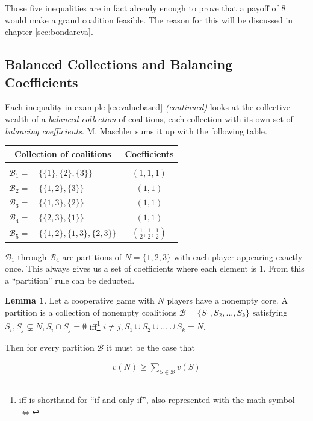 \documentclass[10pt,a4paper,titlepage]{article}
\theoremstyle{plain}
\theoremstyle{definition}
\newtheorem{lemma}[thm]{Lemma}
\begin{document}
Those five inequalities are in fact already enough to prove that a payoff of 8 would make a grand coalition feasible. The reason for this will be discussed in chapter \ref{sec:bondareva}.




\subsection{Balanced Collections and Balancing Coefficients}
Each inequality in example \ref{ex:valuebased} \textit{(continued)} looks at the collective wealth of a \textit{balanced collection} of coalitions, each collection with its own set of \textit{balancing coefficients}. M. Maschler\cite{maschler} sums it up with the following table.\vspace{8pt}

\begin{tabular}{ | r l | c | }
    \multicolumn{2}{c}{Collection of coalitions} & \multicolumn{1}{c}{Coefficients}\\[2pt]
    \hline & & \\[-8pt]
    $\mathcal{B}_1 =$ & $\{\{1\}, \{2\}, \{3\}\}$ & $(1, 1, 1)$\\[2pt]
    $\mathcal{B}_2 =$ & $\{\{1, 2\}, \{3\}\}$ & $(1, 1)$\\[2pt]
    $\mathcal{B}_3 =$ & $\{\{1, 3\}, \{2\}\}$ & $(1, 1)$\\[2pt]
    $\mathcal{B}_4 =$ & $\{\{2, 3\}, \{1\}\}$ & $(1, 1)$\\[2pt]
    $\mathcal{B}_5 =$ & $\{\{1, 2\}, \{1, 3\}, \{2, 3\}\}$ & $(\frac{1}{2}, \frac{1}{2}, \frac{1}{2})$\\[2pt]
    \hline
\end{tabular}\vspace{8pt}

$\mathcal{B}_1$ through $\mathcal{B}_4$ are partitions of $N = \{1, 2, 3\}$ with each player appearing exactly once. This always gives us a set of coefficients where each element is 1. From this a \enquote{partition} rule can be deducted.

\begin{lemma}
    Let a cooperative game with $N$ players have a nonempty core. A partition is a collection of nonempty coalitions $\mathcal{B} = \{S_1, S_2, ..., S_k\}$ satisfying $S_i, S_j \subsetneq N, S_i \cap S_j = \emptyset$ iff\footnote{iff is shorthand for \enquote{if and only if}, also represented with the math symbol $\Leftrightarrow$} $i \neq j, S_1 \cup S_2 \cup ... \cup S_k = N$.

    Then for every partition $\mathcal{B}$ it must be the case that

    \begin{align}
        v(N) \geq \sum_{S \in \mathcal{B}} v(S)
    \end{align}
\end{lemma}
\end{document}
